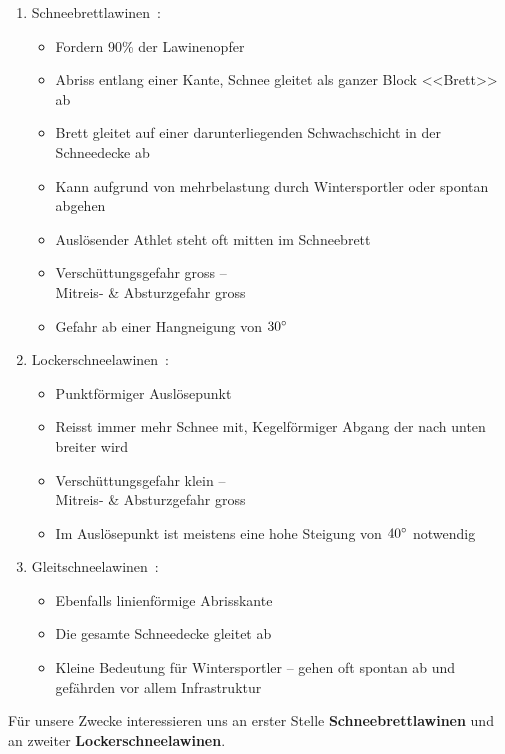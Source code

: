 \begin{enumerate}
  \item Schneebrettlawinen~\cite{sacbergspwinter}\cite{slfLawinentypen}:
  \begin{itemize}
    \item Fordern 90\% der Lawinenopfer
    \item Abriss entlang einer Kante, Schnee gleitet als ganzer Block <<Brett>> ab
    \item Brett gleitet auf einer darunterliegenden Schwachschicht in der Schneedecke ab
    \item Kann aufgrund von mehrbelastung durch Wintersportler oder spontan abgehen
    \item Auslösender Athlet steht oft mitten im Schneebrett
    \item Verschüttungsgefahr gross –\\ Mitreis- \& Absturzgefahr gross
    \item Gefahr ab einer Hangneigung von $30\degree$
  \end{itemize}
    
  \item Lockerschneelawinen~\cite{sacbergspwinter}\cite{slfLawinentypen}:
  \begin{itemize}
    \item Punktförmiger Auslösepunkt
    \item Reisst immer mehr Schnee mit, Kegelförmiger Abgang der nach unten breiter wird
    \item Verschüttungsgefahr klein –\\ Mitreis- \& Absturzgefahr gross
    \item Im Auslösepunkt ist meistens eine hohe Steigung von $40\degree$ notwendig
  \end{itemize}

  \item Gleitschneelawinen~\cite{sacbergspwinter}\cite{slfLawinentypen}:
  \begin{itemize}
    \item Ebenfalls linienförmige Abrisskante
    \item Die gesamte Schneedecke gleitet ab
    \item Kleine Bedeutung für Wintersportler – gehen oft spontan ab und gefährden vor allem Infrastruktur
  \end{itemize}
\end{enumerate}
Für unsere Zwecke interessieren uns an erster Stelle \textbf{Schneebrettlawinen} und an zweiter \textbf{Lockerschneelawinen}.

